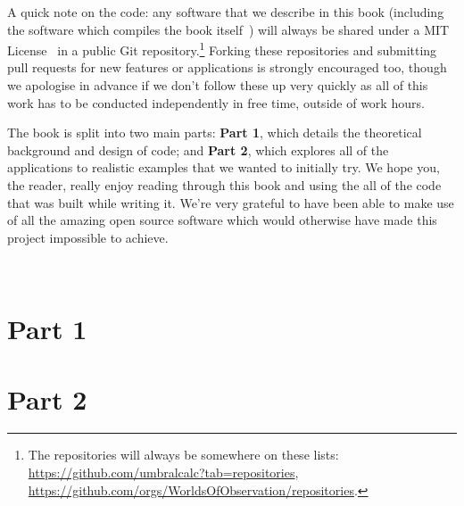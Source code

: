 \documentclass{book}
\begin{document}
A quick note on the code: any software that we describe in this book (including the software which compiles the book itself~\cite{worldsofobservationbookgithub}) will always be shared under a MIT License~\cite{mitlicense} in a public Git repository.\footnote{The repositories will always be somewhere on these lists: \href{https://github.com/umbralcalc?tab=repositories}{https://github.com/umbralcalc?tab=repositories}, \href{https://github.com/orgs/WorldsOfObservation/repositories}{https://github.com/orgs/WorldsOfObservation/repositories}.} Forking these repositories and submitting pull requests for new features or applications is strongly encouraged too, though we apologise in advance if we don't follow these up very quickly as all of this work has to be conducted independently in free time, outside of work hours.

The book is split into two main parts: {\bfseries\sffamily Part 1}, which details the theoretical background and design of code; and {\bfseries\sffamily Part 2}, which explores all of the applications to realistic examples that we wanted to initially try. We hope you, the reader, really enjoy reading through this book and using the all of the code that was built while writing it. We're very grateful to have been able to make use of all the amazing open source software which would otherwise have made this project impossible to achieve.

\newpage \ \newpage
{\sffamily \tableofcontents}
\mainmatter

\part*{{\sffamily Part 1}}













\part*{{\sffamily Part 2}}


\end{document}
